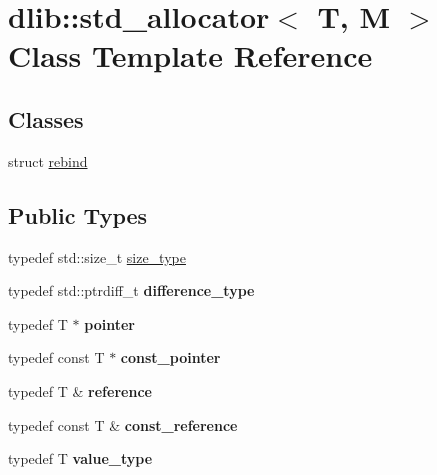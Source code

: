 \hypertarget{classdlib_1_1std__allocator}{
\section{dlib::std\_\-allocator$<$ T, M $>$ Class Template Reference}
\label{classdlib_1_1std__allocator}
}
\subsection*{Classes}
\begin{DoxyCompactItemize}
\item 
struct \hyperlink{structdlib_1_1std__allocator_1_1rebind}{rebind}
\end{DoxyCompactItemize}
\subsection*{Public Types}
\begin{DoxyCompactItemize}
\item 
typedef std::size\_\-t \hyperlink{classdlib_1_1std__allocator_afbdfb9dc5c127fd82f2b1c9f3b1989bf}{size\_\-type}
\item 
\hypertarget{classdlib_1_1std__allocator_aedfcf400c07fda90dd1902c6aba1a25a}{
typedef std::ptrdiff\_\-t {\bfseries difference\_\-type}}
\label{classdlib_1_1std__allocator_aedfcf400c07fda90dd1902c6aba1a25a}

\item 
\hypertarget{classdlib_1_1std__allocator_aa7c4dca5117b25c5f6983cf9ac871b47}{
typedef T $\ast$ {\bfseries pointer}}
\label{classdlib_1_1std__allocator_aa7c4dca5117b25c5f6983cf9ac871b47}

\item 
\hypertarget{classdlib_1_1std__allocator_acfe99966877caf2e39e1164eb6610c1e}{
typedef const T $\ast$ {\bfseries const\_\-pointer}}
\label{classdlib_1_1std__allocator_acfe99966877caf2e39e1164eb6610c1e}

\item 
\hypertarget{classdlib_1_1std__allocator_a85421f2355159d8ed9267899edc14a2a}{
typedef T \& {\bfseries reference}}
\label{classdlib_1_1std__allocator_a85421f2355159d8ed9267899edc14a2a}

\item 
\hypertarget{classdlib_1_1std__allocator_a29a1ef2015acbcf5023e7f7faf5c135c}{
typedef const T \& {\bfseries const\_\-reference}}
\label{classdlib_1_1std__allocator_a29a1ef2015acbcf5023e7f7faf5c135c}

\item 
\hypertarget{classdlib_1_1std__allocator_a0f9b9e955a601d8d55b59f64da6ca551}{
typedef T {\bfseries value\_\-type}}
\label{classdlib_1_1std__allocator_a0f9b9e955a601d8d55b59f64da6ca551}

\end{DoxyCompactItemize}
